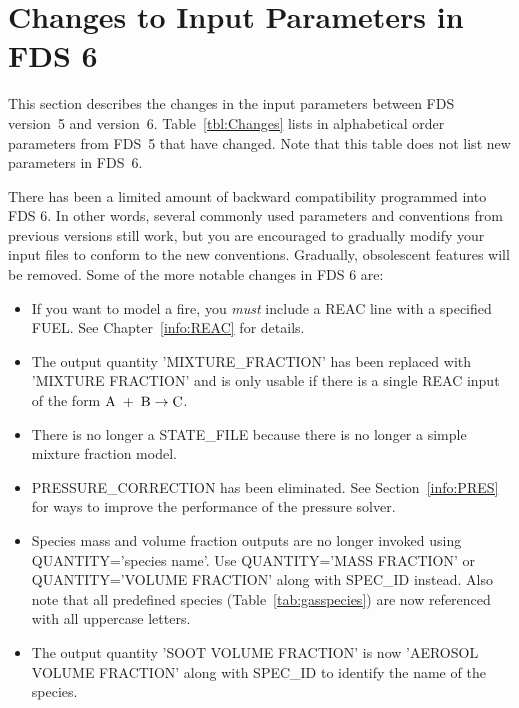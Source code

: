 \documentclass[11pt]{book}
\begin{document}
\section{Changes to Input Parameters in FDS 6}

This section describes the changes in the input parameters between FDS version~5 and version~6. Table~\ref{tbl:Changes} lists in alphabetical order parameters from
FDS~5 that have changed. Note that this table does not list new parameters in FDS~6.

There has been a limited amount of backward compatibility programmed into FDS 6. In other words, several commonly used parameters and conventions from previous versions still
work, but you are encouraged to gradually modify your input files to conform to the new conventions. Gradually, obsolescent features will be removed. Some of the more notable changes
in FDS 6 are:
\begin{itemize}
\item If you want to model a fire, you {\em must} include a {\ct REAC} line with a specified {\ct FUEL}. See Chapter~\ref{info:REAC} for details.
\item The output quantity {\ct 'MIXTURE\_FRACTION'} has been replaced with {\ct 'MIXTURE FRACTION'} and is only usable if there is a single {\ct REAC} input of the form ${\rm A} \; + \; {\rm B} \rightarrow {\rm C}$.
\item There is no longer a {\ct STATE\_FILE} because there is no longer a simple mixture fraction model.
\item {\ct PRESSURE\_CORRECTION} has been eliminated. See Section~\ref{info:PRES} for ways to improve the performance of the pressure solver.
\item Species mass and volume fraction outputs are no longer invoked using {\ct QUANTITY='species name'}. Use {\ct QUANTITY='MASS FRACTION'} or {\ct QUANTITY='VOLUME FRACTION'} along with
{\ct SPEC\_ID} instead.  Also note that all predefined species (Table~\ref{tab:gasspecies}) are now referenced with all uppercase letters.
\item The output quantity {\ct 'SOOT VOLUME FRACTION'} is now {\ct 'AEROSOL VOLUME FRACTION'} along with {\ct SPEC\_ID} to identify the name of the species.
\end{itemize}
\end{document}
